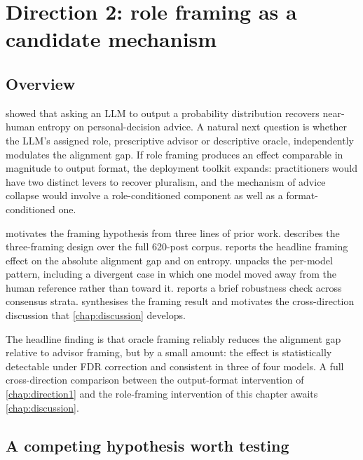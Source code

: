 \chapter{Direction 2: role framing as a candidate mechanism}
\label{chap:direction2}

\section{Overview}
\label{sec:d2_overview}

 showed that asking an LLM to output a probability
distribution recovers near-human entropy on personal-decision advice. A
natural next question is whether the LLM's assigned role, prescriptive
advisor or descriptive oracle, independently modulates the alignment
gap. If role framing produces an effect comparable in magnitude to
output format, the deployment toolkit expands: practitioners would have
two distinct levers to recover pluralism, and the mechanism of advice
collapse would involve a role-conditioned component as well as a
format-conditioned one.

 motivates the framing hypothesis from three
lines of prior work.  describes the three-framing
design over the full 620-post corpus.  reports the
headline framing effect on the absolute alignment gap and on entropy.
 unpacks the per-model pattern, including a
divergent case in which one model moved away from the human reference
rather than toward it.  reports a brief
robustness check across consensus strata. 
synthesises the framing result and motivates the cross-direction
discussion that \cref{chap:discussion} develops.

The headline finding is that oracle framing reliably reduces the
alignment gap relative to advisor framing, but by a small amount: the
effect is statistically detectable under FDR correction and consistent
in three of four models. A full cross-direction comparison between the
output-format intervention of \cref{chap:direction1} and the role-framing
intervention of this chapter awaits \cref{chap:discussion}.

\section{A competing hypothesis worth testing}
\label{sec:d2_hypothesis}

